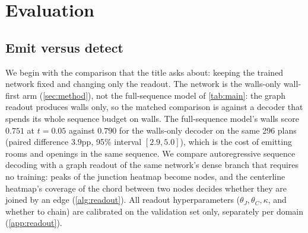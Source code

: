 \documentclass{article}
\begin{document}
\section{Evaluation}

\subsection{Emit versus detect}\label{sec:emitdetect}
We begin with the comparison that the title asks about: keeping the trained
network fixed and changing only the readout. The network is the walls-only
wall-first arm (\cref{sec:method}), not the full-sequence model of
\cref{tab:main}: the graph readout produces walls only, so the matched
comparison is against a decoder that spends its whole sequence budget on
walls. The full-sequence model's walls score $0.751$ at $t=0.05$ against
$0.790$ for the walls-only decoder on the same 296 plans (paired difference
$3.9$pp, 95\% interval $[2.9,5.0]$), which is the cost of emitting rooms and
openings in the same sequence. We compare autoregressive sequence decoding
with a graph readout of the same network's dense branch that requires no
training: peaks of the junction heatmap become nodes, and the centerline
heatmap's coverage of the chord between two nodes decides whether they are
joined by an edge (\cref{alg:readout}). All readout hyperparameters
($\theta_J,\theta_C,\kappa$, and whether to chain) are calibrated on the
validation set only, separately per domain (\cref{app:readout}).
\end{document}
